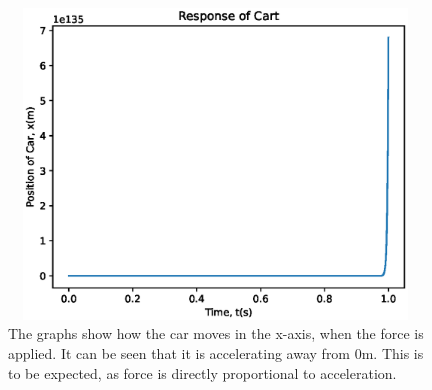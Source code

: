 \documentclass[a4paper,10pt,reqno]{article}
\numberwithin{equation}{section}
\begin{document}
\begin{figure}[H]
\centering
\includegraphics[width=11cm, height=8.25cm]{Response_Cart.eps}
\caption
{The graphs show how the car moves in the x-axis, when the force is applied. It can be seen that it is accelerating away from 0m. This is to be expected, as force is directly proportional to acceleration.}
\end{figure}


\newpage
\end{document}
